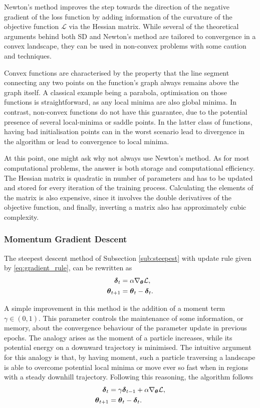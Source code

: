 Newton's method improves the step towards the direction of the negative gradient of the loss function by adding information of the curvature of the objective function $\mathcal{L}$ via the Hessian matrix. While several of the theoretical arguments behind both SD and Newton's method are tailored to convergence in a convex landscape, they can be used in non-convex problems with some caution and techniques.

Convex functions are characterised by the property that the line segment connecting any two points on the function's graph always remains above the graph itself. A classical example being a parabola, optimisation on those functions is straightforward, as any local minima are also global minima. In contrast, non-convex functions do not have this guarantee, due to the potential presence of several local-minima or saddle points. In the latter class of functions, having bad initialisation points can in the worst scenario lead to divergence in the algorithm or lead to convergence to local minima. 

At this point, one might ask why not always use Newton's method. As for most computational problems, the answer is both storage and computational efficiency. The Hessian matrix is quadratic in number of parameters and has to be updated and stored for every iteration of the training process. Calculating the elements of the matrix is also expensive, since it involves the double derivatives of the objective function, and finally, inverting a matrix also has approximately cubic complexity. 

\subsubsection{Momentum Gradient Descent} 

The steepest descent method of Subsection \ref{sub:steepest} with update rule given by \eqref{eq:gradient_rule}, can be rewritten as
\begin{align*}
    \boldsymbol{\delta}_t &= \alpha \nabla_{\boldsymbol{\theta}} \mathcal{L}, \\
    \boldsymbol{\theta}_{t+1} &= \boldsymbol{\theta}_{t} - \boldsymbol{\delta}_t .
\end{align*}

A simple improvement in this method is the addition of a moment term $\gamma \in (0,1)$. This parameter controls the maintenance of some information, or memory, about the convergence behaviour of the parameter update in previous epochs. The analogy arises as the moment of a particle increases, while its potential energy on a downward trajectory is minimised. The intuitive argument for this analogy is that, by having moment, such a particle traversing a landscape is able to overcome potential local minima or move ever so fast when in regions with a steady downhill trajectory. Following this reasoning, the algorithm follows
\begin{align*}
    \boldsymbol{\delta}_t &= \gamma \boldsymbol{\delta}_{t-1}  + \alpha\nabla_{\boldsymbol{\theta}} \mathcal{L}, \\
    \boldsymbol{\theta}_{t+1} &= \boldsymbol{\theta}_{t} - \boldsymbol{\delta}_t.
\end{align*}

